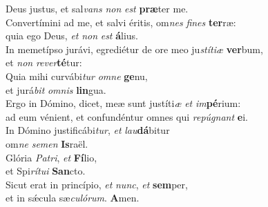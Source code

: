 \oddverse Deus justus, et sal\textit{vans} \textit{non} \textit{est} \textbf{præ}ter me.\\
\evenverse Convertímini ad me, et salvi éritis, om\textit{nes} \textit{fi}\textit{nes} \textbf{ter}ræ:~\*\\
\evenverse quia ego Deus, \textit{et} \textit{non} \textit{est} \textbf{á}lius.\\
\oddverse In memetípso jurávi, egrediétur de ore meo ju\textit{stí}\textit{ti}\textit{æ} \textbf{ver}bum,~\*\\
\oddverse et \textit{non} \textit{re}\textit{ver}\textbf{té}tur:\\
\evenverse Quia mihi curvábi\textit{tur} \textit{om}\textit{ne} \textbf{ge}nu,~\*\\
\evenverse et jurá\textit{bit} \textit{om}\textit{nis} \textbf{lin}gua.\\
\oddverse Ergo in Dómino, dicet, meæ sunt justíti\textit{æ} \textit{et} \textit{im}\textbf{pé}rium:~\*\\
\oddverse ad eum vénient, et confundéntur omnes qui \textit{re}\textit{pú}\textit{gnant} \textbf{e}i.\\
\evenverse In Dómino justificábi\textit{tur}, \textit{et} \textit{lau}\textbf{dá}bitur~\*\\
\evenverse om\textit{ne} \textit{se}\textit{men} \textbf{Is}raël.\\
\oddverse Glória \textit{Pa}\textit{tri}, \textit{et} \textbf{Fí}lio,~\*\\
\oddverse et Spi\textit{rí}\textit{tu}\textit{i} \textbf{San}cto.\\
\evenverse Sicut erat in princípio, \textit{et} \textit{nunc}, \textit{et} \textbf{sem}per,~\*\\
\evenverse et in sǽcula sæ\textit{cu}\textit{ló}\textit{rum}. \textbf{A}men.\\
